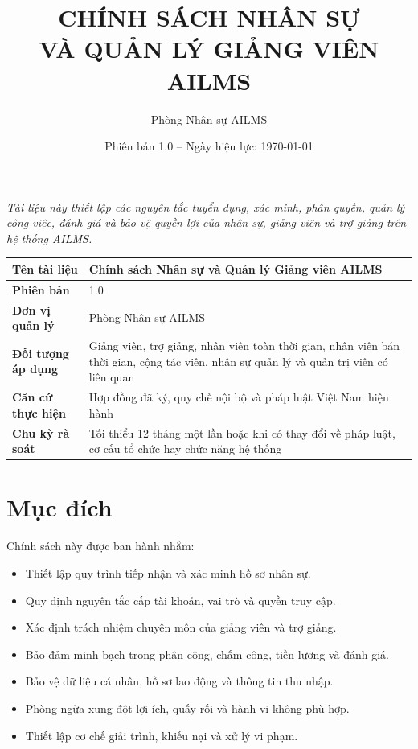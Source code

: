 \documentclass[12pt,a4paper]{article}
\title{
    \textbf{\LARGE CHÍNH SÁCH NHÂN SỰ\\
    VÀ QUẢN LÝ GIẢNG VIÊN AILMS}
}
\author{Phòng Nhân sự AILMS}
\date{Phiên bản 1.0 -- Ngày hiệu lực: \today}
\begin{document}
\maketitle

\begin{center}
    \textit{Tài liệu này thiết lập các nguyên tắc tuyển dụng, xác minh,
    phân quyền, quản lý công việc, đánh giá và bảo vệ quyền lợi
    của nhân sự, giảng viên và trợ giảng trên hệ thống AILMS.}
\end{center}

\vspace{0.8cm}

\begin{longtable}{|>{\bfseries}p{4cm}|p{9.5cm}|}
    \hline
    Tên tài liệu &
    Chính sách Nhân sự và Quản lý Giảng viên AILMS \\
    \hline
    Phiên bản & 1.0 \\
    \hline
    Đơn vị quản lý & Phòng Nhân sự AILMS \\
    \hline
    Đối tượng áp dụng &
    Giảng viên, trợ giảng, nhân viên toàn thời gian, nhân viên bán thời gian,
    cộng tác viên, nhân sự quản lý và quản trị viên có liên quan \\
    \hline
    Căn cứ thực hiện &
    Hợp đồng đã ký, quy chế nội bộ và pháp luật Việt Nam hiện hành \\
    \hline
    Chu kỳ rà soát &
    Tối thiểu 12 tháng một lần hoặc khi có thay đổi về pháp luật,
    cơ cấu tổ chức hay chức năng hệ thống \\
    \hline
\end{longtable}

\tableofcontents
\newpage

\section{Mục đích}

Chính sách này được ban hành nhằm:

\begin{itemize}
    \item Thiết lập quy trình tiếp nhận và xác minh hồ sơ nhân sự.
    \item Quy định nguyên tắc cấp tài khoản, vai trò và quyền truy cập.
    \item Xác định trách nhiệm chuyên môn của giảng viên và trợ giảng.
    \item Bảo đảm minh bạch trong phân công, chấm công, tiền lương và đánh giá.
    \item Bảo vệ dữ liệu cá nhân, hồ sơ lao động và thông tin thu nhập.
    \item Phòng ngừa xung đột lợi ích, quấy rối và hành vi không phù hợp.
    \item Thiết lập cơ chế giải trình, khiếu nại và xử lý vi phạm.
\end{itemize}
\end{document}

